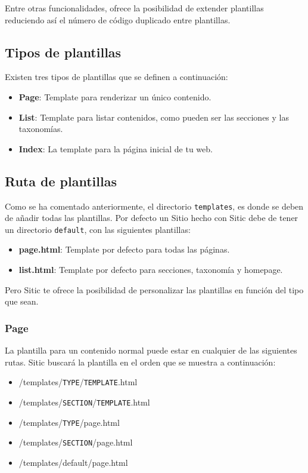 Entre otras funcionalidades, ofrece la posibilidad de extender plantillas reduciendo así el número de
código duplicado entre plantillas.

\subsection{Tipos de plantillas}

Existen tres tipos de plantillas que se definen a continuación:

\begin{itemize}
    \item \textbf{Page}: Template para renderizar un único contenido.
    \item \textbf{List}: Template para listar contenidos, como pueden ser las secciones y las taxonomías.
    \item \textbf{Index}: La template para la página inicial de tu web.
\end{itemize}

\subsection{Ruta de plantillas}

Como se ha comentado anteriormente, el directorio \texttt{templates}, es donde se deben de añadir todas
las plantillas. Por defecto un Sitio hecho con Sitic debe de tener un directorio \texttt{default}, con las
siguientes plantillas:

\begin{itemize}
    \item \textbf{page.html}: Template por defecto para todas las páginas.
    \item \textbf{list.html}: Template por defecto para secciones, taxonomía y homepage.
\end{itemize}

Pero Sitic te ofrece la posibilidad de personalizar las plantillas en función del tipo que sean.

\subsubsection{Page}

La plantilla para un contenido normal puede estar en cualquier de las siguientes rutas. Sitic buscará
la plantilla en el orden que se muestra a continuación:

\begin{itemize}
    \item /templates/\texttt{TYPE}/\texttt{TEMPLATE}.html
    \item /templates/\texttt{SECTION}/\texttt{TEMPLATE}.html
    \item /templates/\texttt{TYPE}/page.html
    \item /templates/\texttt{SECTION}/page.html
    \item /templates/default/page.html
\end{itemize}

